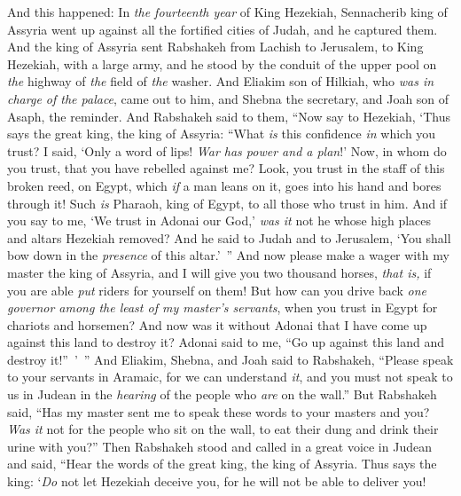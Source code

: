 \begin{biblechapter} %
 And this happened: In \textit{the fourteenth year} of King Hezekiah, Sennacherib king of Assyria went up against all the fortified cities of Judah, and he captured them.
\verse And the king of Assyria sent Rabshakeh from Lachish to Jerusalem, to King Hezekiah, with a large army, and he stood by the conduit of the upper pool on \textit{the} highway of \textit{the} field of \textit{the} washer.
\verse And Eliakim son of Hilkiah, who \textit{was in charge of the palace}, came out to him, and Shebna the secretary, and Joah son of Asaph, the reminder.
\verse And Rabshakeh said to them, “Now say to Hezekiah, ‘Thus says the great king, the king of Assyria: “What \textit{is} this confidence \textit{in} which you trust?
\verse I said, ‘Only a word of lips! \textit{War has power and a plan}!’ Now, in whom do you trust, that you have rebelled against me?
\verse Look, you trust in the staff of this broken reed, on Egypt, which \textit{if} a man leans on it, goes into his hand and bores through it! Such \textit{is} Pharaoh, king of Egypt, to all those who trust in him.
\verse And if you say to me, ‘We trust in Adonai our God,’ \textit{was it} not he whose high places and altars Hezekiah removed? And he said to Judah and to Jerusalem, ‘You shall bow down in the \textit{presence} of this altar.’ ”
\verse And now please make a wager with my master the king of Assyria, and I will give you two thousand horses, \textit{that is,} if you are able \textit{put} riders for yourself on them!
\verse But how can you drive back \textit{one governor among the least of my master’s servants}, when you trust in Egypt for chariots and horsemen?
\verse And now was it without Adonai that I have come up against this land to destroy it? Adonai said to me, “Go up against this land and destroy it!” ’ ”
\verse And Eliakim, Shebna, and Joah said to Rabshakeh, “Please speak to your servants in Aramaic, for we can understand \textit{it}, and you must not speak to us in Judean in the \textit{hearing} of the people who \textit{are} on the wall.”
\verse But Rabshakeh said, “Has my master sent me to speak these words to your masters and you? \textit{Was it} not for the people who sit on the wall, to eat their dung and drink their urine with you?”
\verse Then Rabshakeh stood and called in a great voice in Judean and said, “Hear the words of the great king, the king of Assyria.
\verse Thus says the king: ‘\textit{Do} not let Hezekiah deceive you, for he will not be able to deliver you!

\end{biblechapter}
